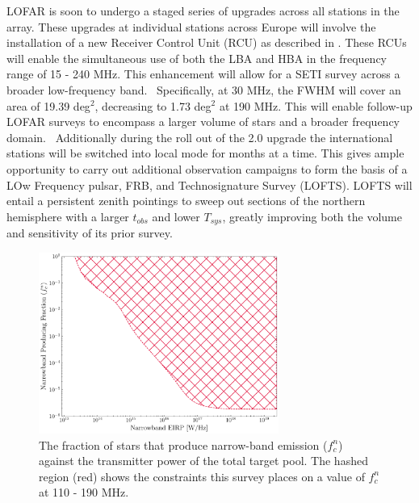 LOFAR is soon to undergo a staged series of upgrades across all stations in the array. These upgrades at individual stations across Europe will involve the installation of a new Receiver Control Unit (RCU) as described in \cite{LOFAR2}. These RCUs will enable the simultaneous use of both the LBA and HBA in the frequency range of 15 - 240 MHz. This enhancement will allow for a SETI survey across a broader low-frequency band. \ Specifically, at 30 MHz, the FWHM will cover an area of 19.39 deg$^2$, decreasing to 1.73 deg$^2$ at 190 MHz. This will enable follow-up LOFAR surveys to encompass a larger volume of stars and a broader frequency domain. \ 
Additionally during the roll out of the 2.0 upgrade the international stations will be switched into local mode for months at a time. This gives ample opportunity to carry out additional observation campaigns to form the basis of a LOw Frequency pulsar, FRB, and Technosignature Survey (LOFTS). LOFTS will entail a persistent zenith pointings to sweep out sections of the northern hemisphere with a larger $t_{obs}$ and lower $T_{sys}$, greatly improving both the volume and sensitivity of its prior survey. 



\begin{figure}
    \centering
    \includegraphics[width = 0.7\textwidth]{figs/narrowband-fraction.pdf}
    \caption{The fraction of stars that produce narrow-band emission ($f^n_c$) against the transmitter power of the total target pool. The hashed region (red) shows the constraints this survey places on a value of $f^n_c$ at 110 - 190 MHz.}
    \label{fig:SETI-constraint}
\end{figure}

